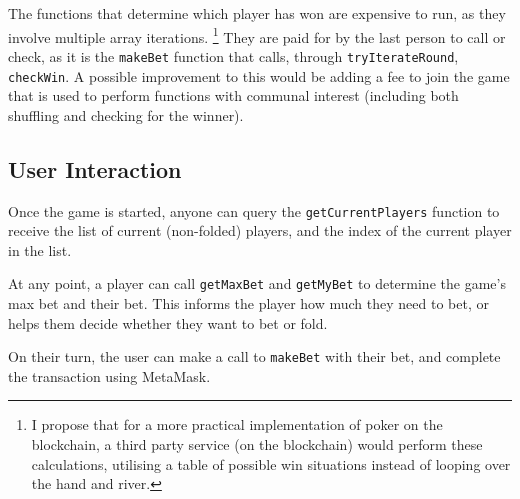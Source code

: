 The functions that determine which player has won are expensive to run, as they involve multiple array iterations. \footnote{I propose that for a more practical implementation of poker on the blockchain, a third party service (on the blockchain) would perform these calculations, utilising a table of possible win situations instead of looping over the hand and river.} They are paid for by the last person to call or check, as it is the \texttt{makeBet} function that calls, through \texttt{tryIterateRound}, \texttt{checkWin}. A possible improvement to this would be adding a fee to join the game that is used to perform functions with communal interest (including both shuffling and checking for the winner).

\subsection{User Interaction}

Once the game is started, anyone can query the \texttt{getCurrentPlayers} function to receive the list of current (non-folded) players, and the index of the current player in the list.

At any point, a player can call \texttt{getMaxBet} and \texttt{getMyBet} to determine the game's max bet and their bet. This informs the player how much they need to bet, or helps them decide whether they want to bet or fold.

On their turn, the user can make a call to \texttt{makeBet} with their bet, and complete the transaction using MetaMask.

